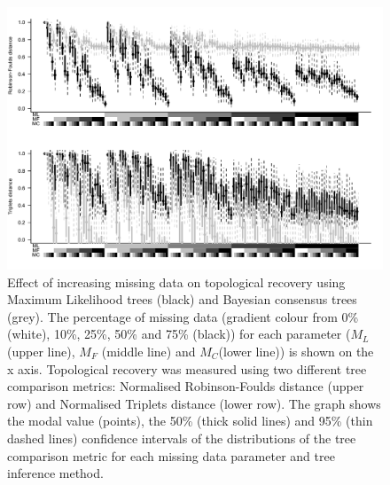 \documentclass[12pt,letterpaper]{article}
\begin{document}
\begin{figure} 
\centering
    \includegraphics[width=1\textwidth]{Figures/In_main/ML+Baycon-AllParam-RF+Tr-BW.pdf}
\caption{Effect of increasing missing data on topological recovery using Maximum Likelihood trees (black) and Bayesian consensus trees (grey). The percentage of missing data (gradient colour from 0\% (white), 10\%, 25\%, 50\% and 75\% (black)) for each parameter ($M_{L}$ (upper line), $M_{F}$ (middle line) and $M_{C}$(lower line)) is shown on the x axis. Topological recovery was measured using two different tree comparison metrics: Normalised Robinson-Foulds distance (upper row) and Normalised Triplets distance (lower row). The graph shows the modal value (points), the 50\% (thick solid lines) and 95\% (thin dashed lines) confidence intervals of the distributions of the tree comparison metric for each missing data parameter and tree inference method.} 
\label{Fig_Results-global_perparam} %
\end{figure}

\label{Fig_Results-paircomp_within}
\end{document}
